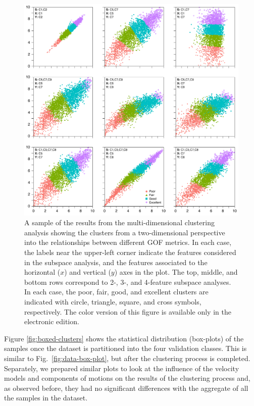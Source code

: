 \begin{figure}[ht!]
	\centering
	\includegraphics[width=\textwidth]{figures/pdf/figure-05}
	\caption{A sample of the results from the multi-dimensional clustering analysis showing the clusters from a two-dimensional perspective into the relationships between different GOF metrics. In each case, the labels near the upper-left corner indicate the features considered in the subspace analysis, and the features associated to the horizontal ($x$) and vertical ($y$) axes in the plot. The top, middle, and bottom rows correspond to 2-, 3-, and 4-feature subspace analyses. In each case, the poor, fair, good, and excellent clusters are indicated with circle, triangle, square, and cross symbols, respectively. The color version of this figure is available only in the electronic edition.}
	\label{fig:clusters}
\end{figure}

Figure \ref{fig:boxed-clusters} shows the statistical distribution (box-plots) of the samples once the dataset is partitioned into the four validation classes. This is similar to Fig.~\ref{fig:data-box-plot}, but after the clustering process is completed. Separately, we prepared similar plots to look at the influence of the velocity models and components of motions on the results of the clustering process and, as observed before, they had no significant differences with the aggregate of all the samples in the dataset.

